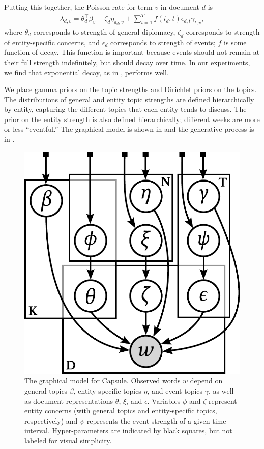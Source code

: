 Putting this together, the Poisson rate for term $v$ in document $d$ is
\begin{align}
  \lambda_{d,v} = \theta_d^\top\beta_v  + \zeta_d \eta_{a_d,v} + \sum_{t=1}^T f(i_d, t) \epsilon_{d,t} \gamma_{t,v},
\label{eq:poisrate}
\end{align} where $\theta_d$ corresponds to strength of general diplomacy, $\zeta_d$ corresponds to strength of entity-specific concerns, and $\epsilon_d$ corresponds to strength of events; $f$ is some function of decay.  This function is important because events should not remain at their full strength indefinitely, but should decay over time.  In our experiments, we find that exponential decay, as in , performs well.

We place gamma priors on the topic strengths and Dirichlet priors on
the topics. The distributions of general and entity topic strengths are defined
hierarchically by entity, capturing the different topics that each
entity tends to discuss.  The prior on the entity strength is
also defined hierarchically; different weeks are more or less
``eventful.'' The graphical model is shown in  and the generative process is in .

\begin{figure}[bt]
\centering
\includegraphics[width=0.5\linewidth]{fig/graphicalmodel.pdf}
\caption{The graphical model for Capsule.  Observed words $w$ depend on general topics $\beta$, entity-specific topics $\eta$, and event topics $\gamma$, as well as document representations $\theta$, $\xi$, and $\epsilon$.  Variables $\phi$ and $\zeta$ represent entity concerns (with general topics and entity-specific topics, respectively) and $\psi$ represents the event strength of a given time interval.  Hyper-parameters are indicated by black squares, but not labeled for visual simplicity.}
\label{fig:graphicalmodel}
\end{figure}


